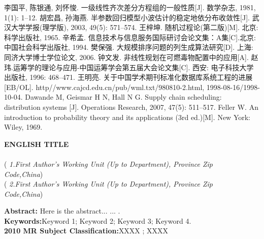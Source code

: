 \documentclass[a4paper,11pt,onecolumn,twoside]{ctexart}
\begin{document}
\vspace{4mm}
\begin{thebibliography}{99}
\addtolength{\itemsep}{-0.8 em} %
    李国平, 陈银通, 刘怀悛. 一级线性齐次差分方程组的一般性质[J]. 数学杂志, 1981, 1(1): 1--12.
   胡宏昌, 孙海燕.
  半参数回归模型小波估计的稳定地依分布收敛性[J].
  武汉大学学报(理学版), 2003, 49(5): 571--574.
    王梓坤. 随机过程论(第二版)[M]. 北京: 科学出版社, 1965.
    辛希孟. 信息技术与信息服务国际研讨会论文集：A集[C].北京: 中国社会科学出版社, 1994.
   樊保强. 大规模排序问题的列生成算法研究[D]. 上海: 同济大学博士学位论文, 2006.
   钟文发. 非线性规划在可燃毒物配置中的应用[A].
  赵玮.运筹学的理论与应用-中国运筹学会第五届大会论文集[C]. 西安: 电子科技大学出版社, 1996: 468--471.
   王明亮. 关于中国学术期刊标准化数据库系统工程的进展[EB/OL].
  http//www.cajcd.edu.cn/pub/wml.txt/980810-2.html, 1998-08-16/1998-10-04.
   Dawande M, Geismar H  N, Hall N G. Supply chain
scheduling: distribution systems [J]. Operations Research, 2007,
47(5): 511--517.
   Feller W.  An introduction to probability theory and its applications (3rd ed.)[M]. New York: Wiley, 1969.


\end{thebibliography}




\vspace{6mm}
\hspace{-8mm}
\parbox{\textwidth}{
\begin{center}
\large{\textbf{ENGLISH TITLE }}\\
\vspace{8mm}
\\[2pt]
(\textit{ 1.First Author's Working Unit (Up to Department), Province Zip ~ Code,China}) \\[2pt]
(\textit{ 2.First Author's Working Unit (Up to Department), Province Zip ~ Code,China}) \\[2pt]
\end{center}

\begin{center}
\begin{minipage}[c]{14cm}
 \hspace{2em}\textbf{Abstract:}
Here is the abstract... ... .\\
\mbox{}\hspace{2.3em}\textbf{Keywords:}\quad Keyword 1; Keyword 2; Keyword 3; Keyword 4.\\
\mbox{}\hspace{2.3em}\textbf{2010 MR  Subject Classification:}\quad XXXX ; XXXX\\

\end{minipage}
\end{center}}

\clearpage
\end{document}
